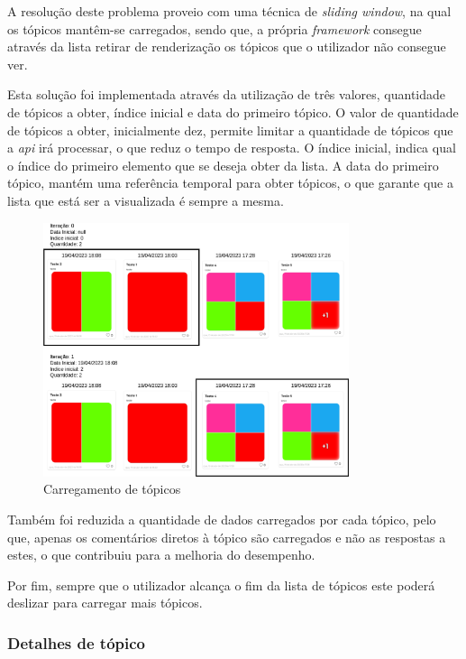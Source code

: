 A resolução deste problema proveio com uma técnica de \textit{sliding window}, na qual os tópicos mantêm-se carregados, sendo que, a própria \textit{framework} consegue através da lista retirar de renderização os tópicos que o utilizador não consegue ver. 

Esta solução foi implementada através da utilização de três valores, quantidade de tópicos a obter, índice inicial e data do primeiro tópico. O valor de quantidade de tópicos a obter, inicialmente dez, permite limitar a quantidade de tópicos que a \textit{\acrshort{api}} irá processar, o que reduz o tempo de resposta. O índice inicial, indica qual o índice do primeiro elemento que se deseja obter da lista. A data do primeiro tópico, mantém uma referência temporal para obter tópicos, o que garante que a lista que está ser a visualizada é sempre a mesma.

\begin{figure}[htb]
 \centering
 \includegraphics[width=0.8\textwidth]{images/implementacao/frontend/forum/loading_topics/topics_loading.png}
 \caption{Carregamento de tópicos}
 \label{fig:74}
\end{figure}
Também foi reduzida a quantidade de dados carregados por cada tópico, pelo que, apenas os comentários diretos à tópico são carregados e não as respostas a estes, o que contribuiu para a melhoria do desempenho.

Por fim, sempre que o utilizador alcança o fim da lista de tópicos este poderá deslizar para carregar mais tópicos.

\newpage

\subsubsection{Detalhes de tópico}

